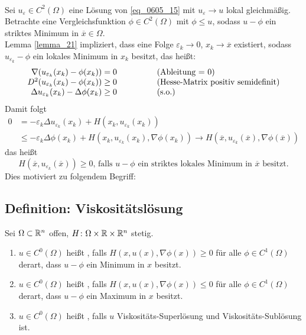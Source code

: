 \mbox{} \\
Sei $u_\varepsilon \in C^2(\Omega)$ eine Lösung von \eqref{eq_0605_15} mit $u_\varepsilon \rightarrow u$ lokal gleichmäßig. Betrachte eine Vergleichsfunktion $\phi \in C^2(\Omega)$ mit $\phi \leq u$, sodass $u-\phi$ ein striktes Minimum in $\overline{x} \in \Omega$. \\
Lemma \ref{lemma_21} impliziert, dass eine Folge $\varepsilon_k \rightarrow 0$, $x_k \rightarrow \overline{x}$ existiert, sodass $u_{\varepsilon_k} - \phi$ ein lokales Minimum in $x_k$ besitzt, das heißt:
\[ \begin{array}{rcl}
	\nabla(u_{\varepsilon_k}(x_k) - \phi(x_k)) = 0	&	\hspace*{1cm}	&	\text{(Ableitung = 0)} \\
	D^2(u_{\varepsilon_k}(x_k) - \phi(x_k)) \geq 0	&	&	\text{(Hesse-Matrix positiv semidefinit)} \\
	\Delta u_{\varepsilon_k}(x_k) - \Delta \phi(x_k) \geq 0	&	& \text{(s.o.)}
\end{array} \]
Damit folgt
\begin{equation}
\begin{aligned}
	0 &= -\varepsilon_k \Delta u_{\varepsilon_k}(x_k) + H(x_k,u_{\varepsilon_k}(x_k)) \\ \label{eq_0605_17}
	&\leq -\varepsilon_k \Delta\phi (x_k) + H(x_k,u_{\varepsilon_k}(x_k),\nabla \phi (x_k)) \rightarrow H(\overline{x},u_{\varepsilon_k}(\overline{x}),\nabla \phi (\overline{x}))
\end{aligned}
\end{equation}
das heißt
\[ H(\overline{x},u_{\varepsilon_k}(\overline{x})) \geq 0 \text{, falls } u-\phi \text{ ein striktes lokales Minimum in } \overline{x} \text{ besitzt.} \]
Dies motiviert zu folgendem Begriff:

\subsection{Definition: Viskositätslösung}
\label{def_22}
	Sei $\Omega \subset \mathbb{R}^n$ offen, $H\colon \Omega \times \mathbb{R} \times \mathbb{R}^n$ stetig. \marginnote{[22]}
	\begin{enumerate}
		\item $u \in C^0(\Omega)$ heißt , falls $H(x,u(x),\nabla\phi(x)) \geq 0$ für alle $\phi \in C^1(\Omega)$ derart, dass $u-\phi$ ein Minimum in $x$ besitzt.
		\item $u \in C^0(\Omega)$ heißt , falls $H(x,u(x),\nabla\phi(x)) \leq 0$ für alle $\phi \in C^1(\Omega)$ derart, dass $u-\phi$ ein Maximum in $x$ besitzt.
		\item $u \in C^0(\Omega)$ heißt , falls $u$ Viskositäts-Superlösung und Viskositäts-Sublösung ist.
	\end{enumerate}

